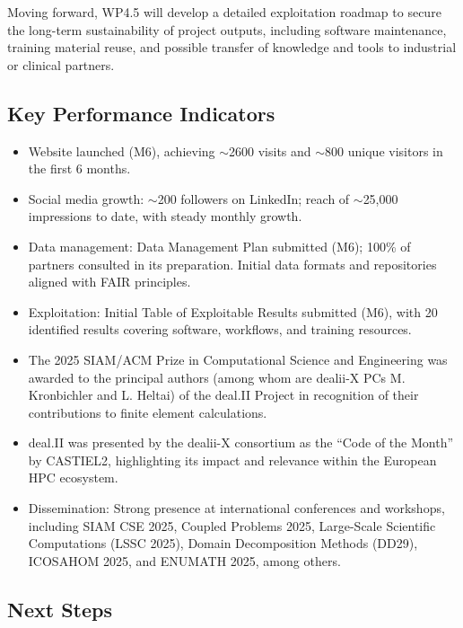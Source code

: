 \documentclass[a4paper,12pt, numbers]{article}
\begin{document}
Moving forward, WP4.5 will develop a detailed exploitation roadmap to secure the long-term sustainability of project outputs, including software maintenance, training material reuse, and possible transfer of knowledge and tools to industrial or clinical partners.



\subsection{Key Performance Indicators} %
\begin{itemize}[left=1em, itemsep=0pt, topsep=0pt]
\item Website launched (M6), achieving $\sim$2600 visits and $\sim$800 unique visitors in the first 6 months.
\item Social media growth: $\sim$200 followers on LinkedIn; reach of $\sim$25,000 impressions to date, with steady monthly growth.
\item Data management: Data Management Plan submitted (M6); 100\% of partners consulted in its preparation. Initial data formats and repositories aligned with FAIR principles.
\item Exploitation: Initial Table of Exploitable Results submitted (M6), with 20 identified results covering software, workflows, and training resources.
\item The 2025 SIAM/ACM Prize in Computational Science and Engineering was awarded to the principal authors (among whom are dealii-X PCs M. Kronbichler and L. Heltai) of the deal.II Project in recognition of their contributions to finite element calculations.
\item deal.II was presented by the dealii-X consortium as the “Code of the Month” by CASTIEL2, highlighting its impact and relevance within the European HPC ecosystem. 
\item Dissemination: Strong presence at international conferences and workshops, including SIAM CSE 2025, Coupled Problems 2025, Large-Scale Scientific Computations (LSSC 2025), Domain Decomposition Methods (DD29), ICOSAHOM 2025, and ENUMATH 2025, among others.
\end{itemize}


\subsection{Next Steps} %
\end{document}
